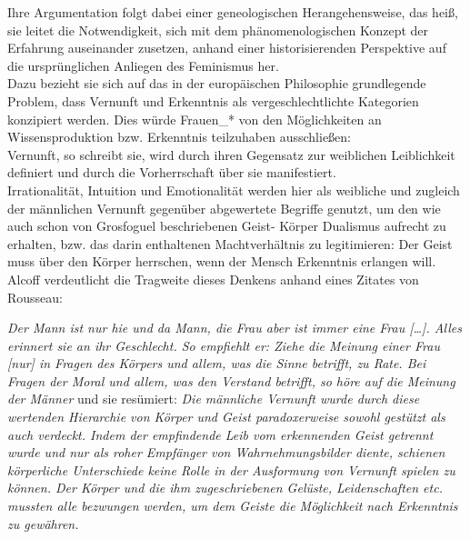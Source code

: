 \noindent Ihre Argumentation folgt dabei
einer geneologischen Herangehensweise, das heiß, sie leitet die Notwendigkeit,
sich mit dem phänomenologischen Konzept der Erfahrung auseinander zusetzen,
anhand einer historisierenden Perspektive auf die ursprünglichen Anliegen des
Feminismus her. \\
Dazu bezieht sie sich auf das in der europäischen Philosophie
grundlegende Problem, dass Vernunft und Erkenntnis als vergeschlechtlichte
Kategorien konzipiert werden. Dies würde Frauen\_* von den Möglichkeiten an
Wissensproduktion bzw. Erkenntnis teilzuhaben ausschließen: \\
Vernunft, so
schreibt sie, wird durch ihren Gegensatz zur weiblichen Leiblichkeit definiert
und durch die Vorherrschaft über sie manifestiert.\footnotemark{} \\
Irrationalität, Intuition und
Emotionalität werden hier als weibliche und zugleich der männlichen Vernunft
gegenüber abgewertete Begriffe genutzt, um den wie auch schon von Grosfoguel
beschriebenen Geist- Körper Dualismus aufrecht zu erhalten, bzw. das darin
enthaltenen Machtverhältnis zu legitimieren: Der Geist muss über den Körper
herrschen, \glqq wenn der Mensch Erkenntnis erlangen will.\grqq \footnotemark
{}\\
Alcoff verdeutlicht die Tragweite dieses Denkens anhand eines Zitates von Rousseau:
\begin{myenv}
 \textit{
 \glqq Der Mann ist nur hie und da Mann, die Frau aber ist immer eine Frau
 […]. Alles erinnert sie an ihr Geschlecht. So empfiehlt er: Ziehe die Meinung
 einer Frau [nur] in Fragen des Körpers und allem, was die Sinne betrifft, zu
 Rate. Bei Fragen der Moral und allem, was den Verstand betrifft, so höre auf
 die Meinung der Männer \grqq \footnotemark {}} und sie resümiert: \textit{ \glqq Die männliche Vernunft wurde
 durch diese wertenden Hierarchie von Körper und Geist paradoxerweise sowohl
 gestützt als auch verdeckt. Indem der empfindende Leib vom erkennenden Geist
 getrennt wurde und nur als roher Empfänger von Wahrnehmungsbilder diente,
 schienen körperliche Unterschiede keine Rolle in der Ausformung von Vernunft
 spielen zu können. Der Körper und die ihm zugeschriebenen Gelüste,
 Leidenschaften etc. mussten alle bezwungen werden, um dem Geiste die
Möglichkeit nach Erkenntnis zu gewähren.\grqq \footnotemark {} } \end{myenv}
